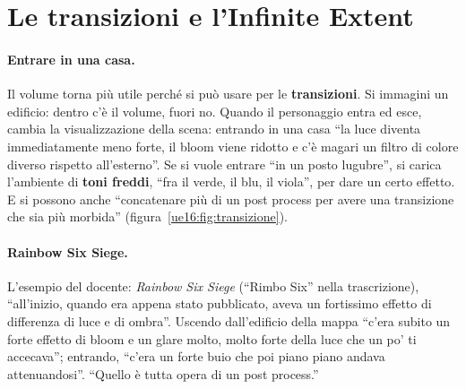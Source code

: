 \section{Le transizioni e l'Infinite Extent}
\label{ue16:sec:transizioni}

\paragraph{Entrare in una casa.} Il volume torna più utile perché si può usare per le
\textbf{transizioni}. Si immagini un edificio: dentro c'è il volume, fuori no. Quando il
personaggio entra ed esce, cambia la visualizzazione della scena: entrando in una casa ``la
luce diventa immediatamente meno forte, il bloom viene ridotto e c'è magari un filtro di
colore diverso rispetto all'esterno''. Se si vuole entrare ``in un posto lugubre'', si carica
l'ambiente di \textbf{toni freddi}, ``fra il verde, il blu, il viola'', per dare un certo
effetto. E si possono anche ``concatenare più di un post process per avere una transizione
che sia più morbida'' (figura~\ref{ue16:fig:transizione}).

\paragraph{Rainbow Six Siege.} L'esempio del docente: \emph{Rainbow Six Siege} (``Rimbo
Six'' nella trascrizione), ``all'inizio, quando era appena stato pubblicato, aveva un
fortissimo effetto di differenza di luce e di ombra''. Uscendo dall'edificio della mappa
``c'era subito un forte effetto di bloom e un glare molto, molto forte della luce che un po' ti
accecava''; entrando, ``c'era un forte buio che poi piano piano andava attenuandosi''. ``Quello
è tutta opera di un post process.''

